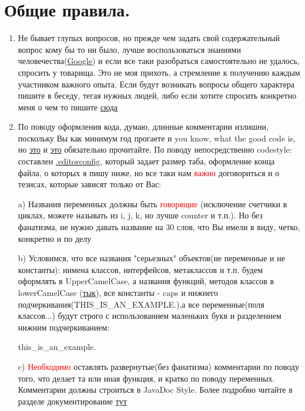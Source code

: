 \documentclass{article}
\begin{document}
\section{Общие правила.}
\begin{enumerate}
    \item Не бывает глупых вопросов, но прежде чем задать свой содержательный вопрос кому бы то ни было, лучше воспользоваться знаниями человечества(\href{https://google.com/}{Google}) и если все таки разобраться самостоятельно не удалось, спросить у товарища. Это не моя прихоть, а стремление к получению каждым участником важного опыта. Если будут возникать вопросы общего характера пишите в беседу, тегая нужных людей, либо если хотите спросить конкретно меня о чем то пишите \href{https://t.me/IvanBazalii}{сюда}
    \item По поводу оформления кода, думаю, длинные комментарии излишни, поскольку Вы как минимум год прогаете и you know, what the good code is, но \href{http://neerc.ifmo.ru/teaching/disalgo/cppcodestyle.pdf}{это} и  \href{https://google.github.io/styleguide/}{это} обязательно прочитайте. По поводу непосредственно codestyle: составлен  \href{https://github.com/Bazalii/School_Live_Simulator/blob/master/.editorconfig}{.editorconfig}, который задает размер таба, оформление конца файла, о которых я пишу ниже, но все таки нам \textcolor{red}{важно} договориться и о тезисах, которые зависят только от Вас: 
    
    a) Названия переменных должны быть \textcolor{red}{говорящие} (исключение счетчики в циклах, можете называть из i, j, k, но лучше counter и т.п.). Но без фанатизма, не нужно давать название на 30 слов, что Вы имели в виду, четко, конкретно и по делу
    
    b) Условимся, что все названия "серьезных" объектов(не переменные и не константы):  нимена классов, интерфейсов, метаклассов и т.п. будем оформлять в UpperCamelCase, а названия функций, методов классов в lowerCamelCase (\href{https://ru.wikipedia.org/wiki/CamelCase}{тык}), все константы - caps и нижнего подчеркивания(THIS\_IS\_AN\_EXAMPLE.),а все переменные(поля классов...) будут строго с использованием маленьких букв и разделением нижним подчеркиванием: 
    
    this\_is\_an\_example.
    
    c) \textcolor{red}{Необходимо} оставлять развернутые(без фанатизма) комментарии по поводу того, что делает та или иная функция, и кратко по поводу переменных. Комментарии должны строиться в JavaDoc Style. Более подробно читайте в разделе документирование \href{https://github.com/Bazalii/School_Live_Simulator/blob/master/Documents/Project_formalization.pdf}{тут}
    

\end{enumerate}
\end{document}
